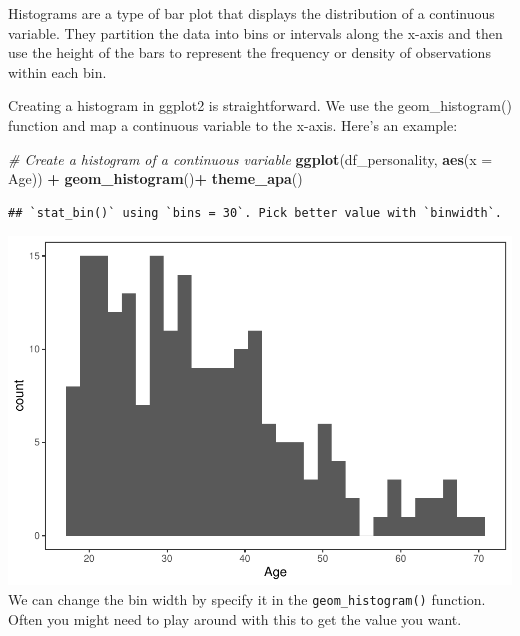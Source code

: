 \documentclass[
]{book}
\newenvironment{Shaded}{\begin{snugshade}}{\end{snugshade}}
\newcommand{\AttributeTok}[1]{\textcolor[rgb]{0.13,0.29,0.53}{#1}}
\newcommand{\CommentTok}[1]{\textcolor[rgb]{0.56,0.35,0.01}{\textit{#1}}}
\newcommand{\FunctionTok}[1]{\textcolor[rgb]{0.13,0.29,0.53}{\textbf{#1}}}
\newcommand{\NormalTok}[1]{#1}
\newcommand{\SpecialCharTok}[1]{\textcolor[rgb]{0.81,0.36,0.00}{\textbf{#1}}}
\begin{document}
Histograms are a type of bar plot that displays the distribution of a continuous variable. They partition the data into bins or intervals along the x-axis and then use the height of the bars to represent the frequency or density of observations within each bin.

Creating a histogram in ggplot2 is straightforward. We use the geom\_histogram() function and map a continuous variable to the x-axis. Here's an example:

\begin{Shaded}
\begin{Highlighting}[]
\CommentTok{\# Create a histogram of a continuous variable}
\FunctionTok{ggplot}\NormalTok{(df\_personality, }\FunctionTok{aes}\NormalTok{(}\AttributeTok{x =}\NormalTok{ Age)) }\SpecialCharTok{+}
  \FunctionTok{geom\_histogram}\NormalTok{()}\SpecialCharTok{+}
  \FunctionTok{theme\_apa}\NormalTok{()}
\end{Highlighting}
\end{Shaded}

\begin{verbatim}
## `stat_bin()` using `bins = 30`. Pick better value with `binwidth`.
\end{verbatim}

\includegraphics{rintro_demo_files/figure-latex/unnamed-chunk-325-1.pdf}
We can change the bin width by specify it in the \texttt{geom\_histogram()} function. Often you might need to play around with this to get the value you want.
\end{document}
